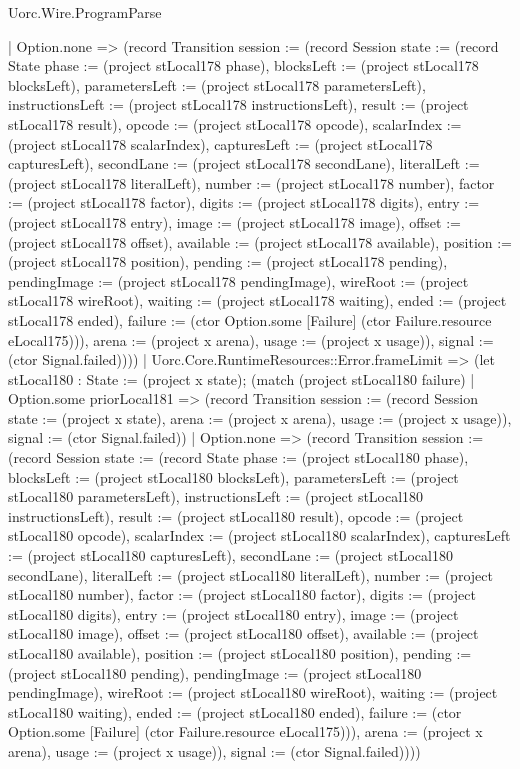 \begin{lexlean}{Uorc.Wire.ProgramParse}
\begin{semanticmodule}
{        | Option.none => (record Transition {session := (record Session {state := (record State {phase := (project stLocal178 phase), blocksLeft := (project stLocal178 blocksLeft), parametersLeft := (project stLocal178 parametersLeft), instructionsLeft := (project stLocal178 instructionsLeft), result := (project stLocal178 result), opcode := (project stLocal178 opcode), scalarIndex := (project stLocal178 scalarIndex), capturesLeft := (project stLocal178 capturesLeft), secondLane := (project stLocal178 secondLane), literalLeft := (project stLocal178 literalLeft), number := (project stLocal178 number), factor := (project stLocal178 factor), digits := (project stLocal178 digits), entry := (project stLocal178 entry), image := (project stLocal178 image), offset := (project stLocal178 offset), available := (project stLocal178 available), position := (project stLocal178 position), pending := (project stLocal178 pending), pendingImage := (project stLocal178 pendingImage), wireRoot := (project stLocal178 wireRoot), waiting := (project stLocal178 waiting), ended := (project stLocal178 ended), failure := (ctor Option.some [Failure] (ctor Failure.resource eLocal175))}), arena := (project x arena), usage := (project x usage)}), signal := (ctor Signal.failed)})))
      | Uorc.Core.RuntimeResources::Error.frameLimit => (let stLocal180 : State := (project x state); (match (project stLocal180 failure)
        | Option.some priorLocal181 => (record Transition {session := (record Session {state := (project x state), arena := (project x arena), usage := (project x usage)}), signal := (ctor Signal.failed)})
        | Option.none => (record Transition {session := (record Session {state := (record State {phase := (project stLocal180 phase), blocksLeft := (project stLocal180 blocksLeft), parametersLeft := (project stLocal180 parametersLeft), instructionsLeft := (project stLocal180 instructionsLeft), result := (project stLocal180 result), opcode := (project stLocal180 opcode), scalarIndex := (project stLocal180 scalarIndex), capturesLeft := (project stLocal180 capturesLeft), secondLane := (project stLocal180 secondLane), literalLeft := (project stLocal180 literalLeft), number := (project stLocal180 number), factor := (project stLocal180 factor), digits := (project stLocal180 digits), entry := (project stLocal180 entry), image := (project stLocal180 image), offset := (project stLocal180 offset), available := (project stLocal180 available), position := (project stLocal180 position), pending := (project stLocal180 pending), pendingImage := (project stLocal180 pendingImage), wireRoot := (project stLocal180 wireRoot), waiting := (project stLocal180 waiting), ended := (project stLocal180 ended), failure := (ctor Option.some [Failure] (ctor Failure.resource eLocal175))}), arena := (project x arena), usage := (project x usage)}), signal := (ctor Signal.failed)})))
}
\end{semanticmodule}
\end{lexlean}
